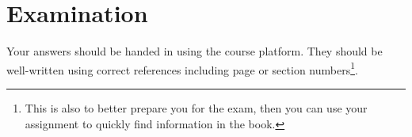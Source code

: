 \section{Examination}
\label{sec:Examination}
\noindent
Your answers should be handed in using the course platform.
They should be well-written using correct references including page or section 
numbers\footnote{%
	This is also to better prepare you for the exam, then you can use your 
	assignment to quickly find information in the book.
}.
